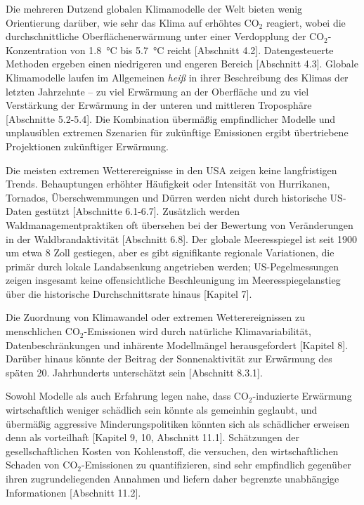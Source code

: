 \documentclass[12pt,paper=a4,DIV=12,parskip=never,chapterprefix=false,headings=standardclasses]{scrreprt}
\begin{document}
Die mehreren Dutzend globalen Klimamodelle der Welt bieten wenig Orientierung darüber, wie sehr das Klima auf erhöhtes CO$_2$ reagiert, wobei die durchschnittliche Oberflächenerwärmung unter einer Verdopplung der CO$_2$-Konzentration von \SI{1.8}{\celsius} bis \SI{5.7}{\celsius} reicht [Abschnitt 4.2]. Datengesteuerte Methoden ergeben einen niedrigeren und engeren Bereich [Abschnitt 4.3]. Globale Klimamodelle laufen im Allgemeinen \emph{heiß} in ihrer Beschreibung des Klimas der letzten Jahrzehnte -- zu viel Erwärmung an der Oberfläche und zu viel Verstärkung der Erwärmung in der unteren und mittleren Troposphäre [Abschnitte 5.2-5.4]. Die Kombination übermäßig empfindlicher Modelle und unplausiblen extremen Szenarien für zukünftige Emissionen ergibt übertriebene Projektionen zukünftiger Erwärmung.

Die meisten extremen Wetterereignisse in den USA zeigen keine langfristigen Trends. Behauptungen erhöhter Häufigkeit oder Intensität von Hurrikanen, Tornados, Überschwemmungen und Dürren werden nicht durch historische US-Daten gestützt [Abschnitte 6.1-6.7]. Zusätzlich werden Waldmanagementpraktiken oft übersehen bei der Bewertung von Veränderungen in der Waldbrandaktivität [Abschnitt 6.8]. Der globale Meeresspiegel ist seit 1900 um etwa 8 Zoll gestiegen, aber es gibt signifikante regionale Variationen, die primär durch lokale Landabsenkung angetrieben werden; US-Pegelmessungen zeigen insgesamt keine offensichtliche Beschleunigung im Meeresspiegelanstieg über die historische Durchschnittsrate hinaus [Kapitel 7].

Die Zuordnung von Klimawandel oder extremen Wetterereignissen zu menschlichen CO$_2$-Emissionen wird durch natürliche Klimavariabilität, Datenbeschränkungen und inhärente Modellmängel herausgefordert [Kapitel 8]. Darüber hinaus könnte der Beitrag der Sonnenaktivität zur Erwärmung des späten 20. Jahrhunderts unterschätzt sein [Abschnitt 8.3.1].

Sowohl Modelle als auch Erfahrung legen nahe, dass CO$_2$-induzierte Erwärmung wirtschaftlich weniger schädlich sein könnte als gemeinhin geglaubt, und übermäßig aggressive Minderungspolitiken könnten sich als schädlicher erweisen denn als vorteilhaft [Kapitel 9, 10, Abschnitt 11.1]. Schätzungen der gesellschaftlichen Kosten von Kohlenstoff, die versuchen, den wirtschaftlichen Schaden von CO$_2$-Emissionen zu quantifizieren, sind sehr empfindlich gegenüber ihren zugrundeliegenden Annahmen und liefern daher begrenzte unabhängige Informationen [Abschnitt 11.2].
\end{document}
